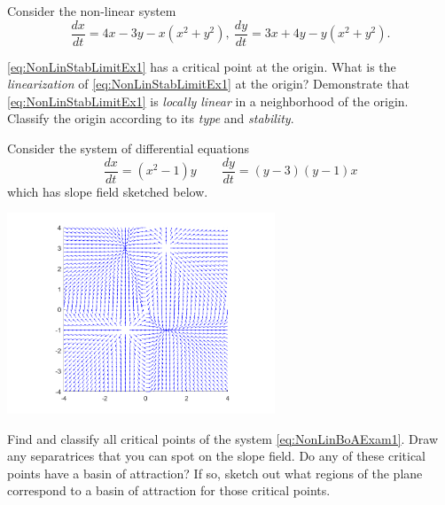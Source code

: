 \begin{exercise}
Consider the non-linear system
\begin{equation}
\frac{dx}{dt}=4x-3y-x(x^2+y^2), \ \frac{dy}{dt}=3x+4y-y(x^2+y^2). \label{eq:NonLinStabLimitEx1} %
\end{equation}
\begin{tasks}
\task \eqref{eq:NonLinStabLimitEx1} has a critical point at the origin. What is the {\it linearization} of \eqref{eq:NonLinStabLimitEx1} at the origin?
\task Demonstrate that \eqref{eq:NonLinStabLimitEx1} is {\it locally linear} in a neighborhood of the origin. 
\task Classify the origin according to its {\it type} and {\it stability}.
\end{tasks}
\end{exercise}

\begin{exercise} 
Consider the system of differential equations
\begin{equation}
\frac{dx}{dt} = (x^2 - 1)y \qquad \frac{dy}{dt} = (y-3)(y-1)x \label{eq:NonLinBoAExam1}
\end{equation}
which has slope field sketched below.
\begin{center}
\includegraphics[width=0.6\textwidth]{Images/NLBoA_Ex1.png}
\end{center}
\begin{tasks}
\task Find and classify all critical points of the system \eqref{eq:NonLinBoAExam1}.
\task Draw any separatrices that you can spot on the slope field.
\task Do any of these critical points have a basin of attraction? If so, sketch out what regions of the plane correspond to a basin of attraction for those critical points. 
\end{tasks}
\end{exercise}

